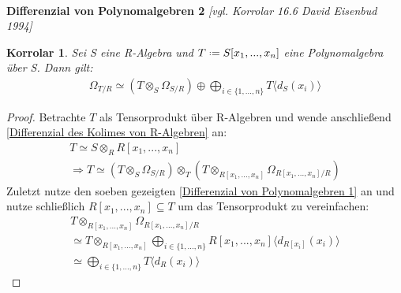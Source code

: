 \documentclass[10pt,a4paper]{report}
\newcommand{\ModulsOfDifferenzials}{David Eisenbud 1994}
\newcounter{Aussage}[chapter]
\newtheorem{korrolar}[Aussage]{Korrolar}
\newcommand{\divR}[2]{\Omega_{#1/#2}}
\newcommand{\divf}[1]{d_{#1}}
\newcommand{\Tensor}[3]{#1 \otimes_{#2} #3}
\newcommand*{\defeq}{\mathrel{\vcenter{\baselineskip0.5ex \lineskiplimit0pt
                     \hbox{\scriptsize.}\hbox{\scriptsize.}}}%
                     =}
\begin{document}
\ \\
\textbf{Differenzial von Polynomalgebren 2} \textit{[vgl. Korrolar 16.6 \ModulsOfDifferenzials]}
\begin{korrolar}\label{Differenzial von Polynomalgebren 2}
Sei S eine R-Algebra und $T \defeq S[x_1,...,x_n]$ eine Polynomalgebra über S. Dann gilt:
\begin{gather*}
\divR{T}{R} \simeq (\Tensor{T}{S}{\divR{S}{R}}) \oplus \bigoplus_{i \in \lbrace 1,...,n \rbrace} T \langle \divf{S}(x_i) \rangle
\end{gather*}
\end{korrolar}
\begin{proof}
Betrachte $T$ als Tensorprodukt über R-Algebren und wende anschließend \cref{Differenzial des Kolimes von R-Algebren} an:
\begin{gather*}
T \simeq \Tensor{S}{R}{R[x_1,...,x_n]} \\
\Rightarrow T \simeq \Tensor{(\Tensor{T}{S}{\divR{S}{R}})}{T}{(\Tensor{T}{R[x_1,...,x_n]}{\divR{R[x_1,...,x_n]}{R}})}
\end{gather*}
Zuletzt nutze den soeben gezeigten \cref{Differenzial von Polynomalgebren 1} an und nutze schließlich $R[x_1,...,x_n] \subseteq T$ um das Tensorprodukt zu vereinfachen:
\begin{gather*}
\Tensor{T}{R[x_1,...,x_n]}{\divR{R[x_1,...,x_n]}{R}}\\
\simeq \Tensor{T}{R[x_1,...,x_n]}{\bigoplus_{i \in \lbrace 1,...,n \rbrace} R[x_1,...,x_n]\langle \divf{R[x_i]}(x_i) \rangle } \\
\simeq \bigoplus_{i \in \lbrace 1,...,n \rbrace} T \langle \divf{R}(x_i) \rangle
\end{gather*}
\end{proof}
\end{document}
